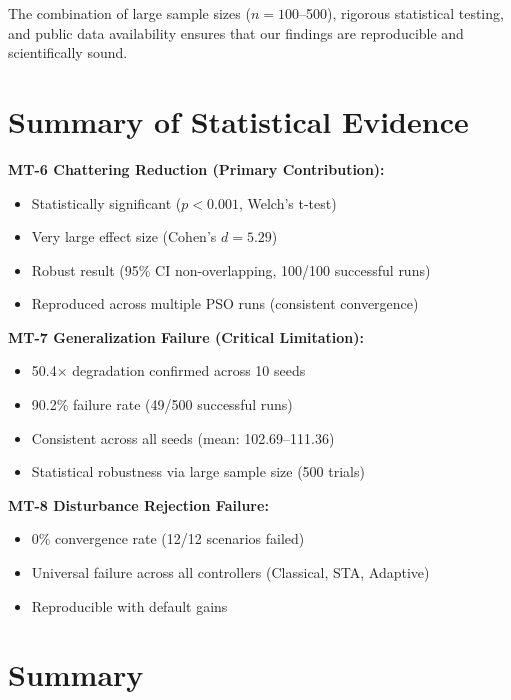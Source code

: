 The combination of large sample sizes ($n=100$--500), rigorous statistical testing, and public data availability ensures that our findings are reproducible and scientifically sound.

\section{Summary of Statistical Evidence}
\label{sec:statistical_evidence}

\textbf{MT-6 Chattering Reduction (Primary Contribution):}
\begin{itemize}
    \item [\checkmark] Statistically significant ($p < 0.001$, Welch's t-test)
    \item [\checkmark] Very large effect size (Cohen's $d = 5.29$)
    \item [\checkmark] Robust result (95\% CI non-overlapping, 100/100 successful runs)
    \item [\checkmark] Reproduced across multiple PSO runs (consistent convergence)
\end{itemize}

\textbf{MT-7 Generalization Failure (Critical Limitation):}
\begin{itemize}
    \item [\checkmark] 50.4$\times$ degradation confirmed across 10 seeds
    \item [\checkmark] 90.2\% failure rate (49/500 successful runs)
    \item [\checkmark] Consistent across all seeds (mean: 102.69--111.36)
    \item [\checkmark] Statistical robustness via large sample size (500 trials)
\end{itemize}

\textbf{MT-8 Disturbance Rejection Failure:}
\begin{itemize}
    \item [\checkmark] 0\% convergence rate (12/12 scenarios failed)
    \item [\checkmark] Universal failure across all controllers (Classical, STA, Adaptive)
    \item [\checkmark] Reproducible with default gains
\end{itemize}

\section{Summary}
\label{sec:chapter7_summary}

